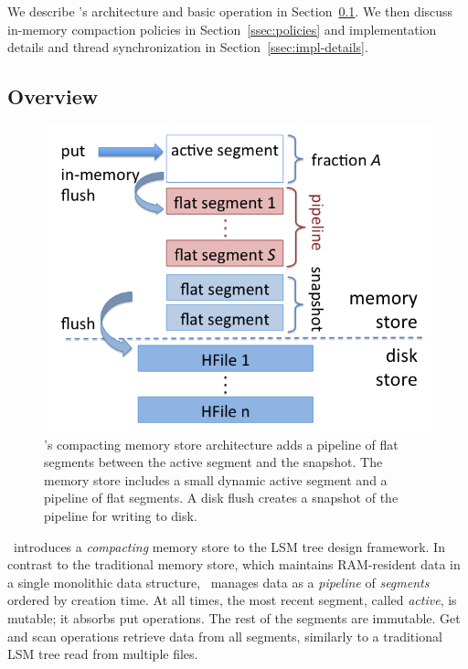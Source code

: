 
We describe  \sys's architecture and basic operation in Section~\ref{ssec:overview}.
We then discuss in-memory compaction policies  in  Section~\ref{ssec:policies}
and implementation details and thread synchronization in Section~\ref{ssec:impl-details}.

\subsection{Overview} \label{ssec:overview}

\begin{figure}[tbh]
\center
\includegraphics[width=\columnwidth]{Accordion} 
\caption{\sys's compacting memory store architecture adds a pipeline of flat segments between the active segment and the snapshot. 
The memory store includes a small dynamic active segment 
and a pipeline of flat segments. A disk flush creates a snapshot of the pipeline for writing to disk.}
\label{fig:accordion}
\end{figure}

\sys\ introduces a \emph{compacting} memory store to the LSM tree design framework. In contrast to the traditional memory store, 
which maintains RAM-resident data in a single monolithic data structure, \sys\ manages data as a \emph{pipeline} of 
\emph{segments} ordered by creation time. At all times, the most recent segment, called \emph{active}, is mutable;
it absorbs  put operations. The rest of the segments are immutable. Get and scan operations retrieve data from all  segments, 
 similarly to a traditional LSM tree read from multiple files. 
 
